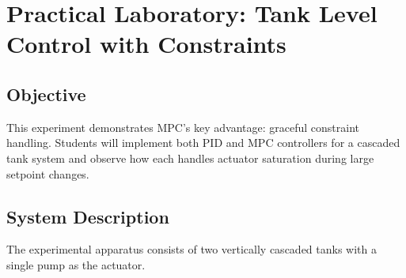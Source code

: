 \section{Practical Laboratory: Tank Level Control with Constraints}
\label{sec:lab}

\subsection{Objective}

This experiment demonstrates MPC's key advantage: graceful constraint handling. Students will implement both PID and MPC controllers for a cascaded tank system and observe how each handles actuator saturation during large setpoint changes.

\subsection{System Description}

The experimental apparatus consists of two vertically cascaded tanks with a single pump as the actuator.

